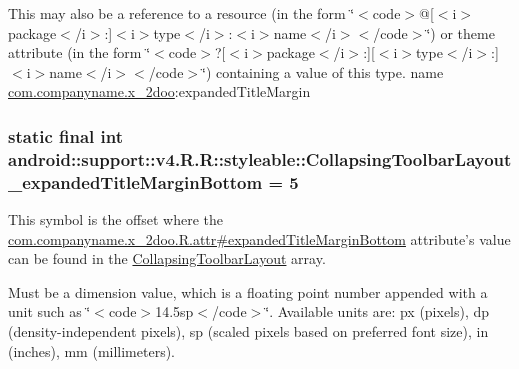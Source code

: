 This may also be a reference to a resource (in the form \char`\"{}$<$code$>$@\mbox{[}$<$i$>$package$<$/i$>$:\mbox{]}$<$i$>$type$<$/i$>$:$<$i$>$name$<$/i$>$$<$/code$>$\char`\"{}) or theme attribute (in the form \char`\"{}$<$code$>$?\mbox{[}$<$i$>$package$<$/i$>$:\mbox{]}\mbox{[}$<$i$>$type$<$/i$>$:\mbox{]}$<$i$>$name$<$/i$>$$<$/code$>$\char`\"{}) containing a value of this type.  name \hyperlink{namespacecom_1_1companyname_1_1x__2doo}{com.companyname.x\_\-2doo}:expandedTitleMargin \hypertarget{classandroid_1_1support_1_1v4_1_1_r_1_1styleable_3c19128c4f13cc0876d4f6a58f4e2d88}{
\subsubsection[{CollapsingToolbarLayout\_\-expandedTitleMarginBottom}]{\setlength{\rightskip}{0pt plus 5cm}static final int android::support::v4.R.R::styleable::CollapsingToolbarLayout\_\-expandedTitleMarginBottom = 5}}
\label{classandroid_1_1support_1_1v4_1_1_r_1_1styleable_3c19128c4f13cc0876d4f6a58f4e2d88}


This symbol is the offset where the \hyperlink{classcom_1_1companyname_1_1x__2doo_1_1_r_1_1attr_755e19e1142648c5041500a0e2461e07}{com.companyname.x\_\-2doo.R.attr\#expandedTitleMarginBottom} attribute's value can be found in the \hyperlink{classandroid_1_1support_1_1v4_1_1_r_1_1styleable_aa101903fcf4b45a3b7fee0a0abc5ea8}{CollapsingToolbarLayout} array.

Must be a dimension value, which is a floating point number appended with a unit such as \char`\"{}$<$code$>$14.5sp$<$/code$>$\char`\"{}. Available units are: px (pixels), dp (density-independent pixels), sp (scaled pixels based on preferred font size), in (inches), mm (millimeters). 

